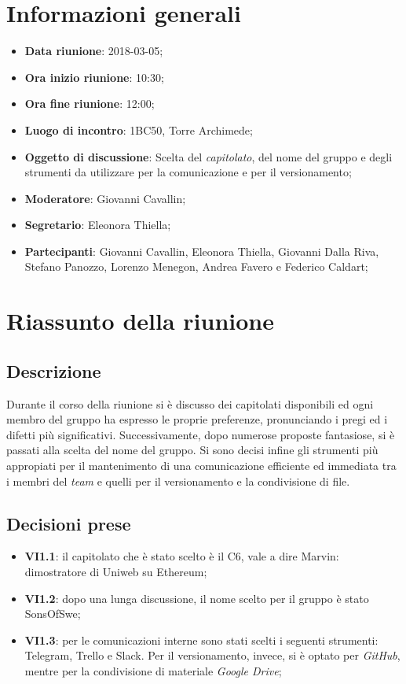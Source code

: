 \section{Informazioni generali}
	\begin{itemize}
		\item \textbf{Data riunione}: 2018-03-05;
		\item \textbf{Ora inizio riunione}: 10:30;
		\item \textbf{Ora fine riunione}: 12:00;
		\item \textbf{Luogo di incontro}: 1BC50, Torre Archimede;
		\item \textbf{Oggetto di discussione}: Scelta del \emph{capitolato}, del nome del gruppo e degli strumenti da utilizzare per la comunicazione e per il versionamento;
		\item \textbf{Moderatore}: Giovanni Cavallin;
		\item \textbf{Segretario}: Eleonora Thiella;
		\item \textbf{Partecipanti}: Giovanni Cavallin, Eleonora Thiella, Giovanni Dalla Riva, Stefano Panozzo, Lorenzo Menegon, Andrea Favero e Federico Caldart;
	\end{itemize}

\section{Riassunto della riunione}
	\subsection{Descrizione}
	Durante il corso della riunione si è discusso dei capitolati disponibili ed ogni membro del gruppo ha espresso le proprie preferenze, pronunciando i pregi ed i difetti più significativi. Successivamente, dopo numerose proposte fantasiose, si è passati alla scelta del nome del gruppo. Si sono decisi infine gli strumenti più appropiati per il mantenimento di una comunicazione efficiente ed immediata tra i membri del \emph{team} e quelli per il versionamento e la condivisione di file. 
	
	\subsection{Decisioni prese}
		\begin{itemize}
			\item \textbf{VI1.1}: il capitolato che è stato scelto è il C6, vale a dire Marvin: dimostratore di Uniweb su Ethereum;
			\item \textbf{VI1.2}: dopo una lunga discussione, il nome scelto per il gruppo è stato SonsOfSwe;
			\item \textbf{VI1.3}: per le comunicazioni interne sono stati scelti i seguenti strumenti: Telegram, Trello e Slack. Per il versionamento, invece, si è optato per \emph{GitHub}, mentre per la condivisione di materiale \emph{Google Drive}; 
		\end{itemize}